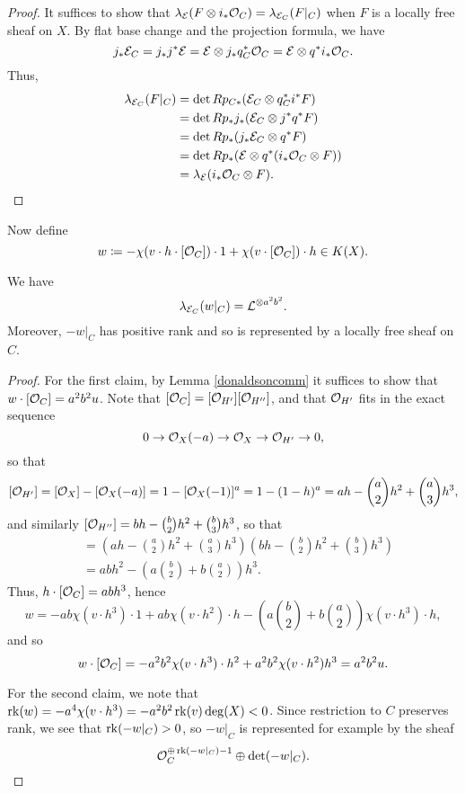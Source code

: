\begin{proof}
    It suffices to show that $\lambda_{\mathcal{E}}(F \otimes i_*\mathcal{O}_C) = \lambda_{\mathcal{E}_C}(F|_C)$ when $F$ is a locally free sheaf on $X$. By flat base change and the projection formula, we have
    \[ j_*\mathcal{E}_C = j_* j^* \mathcal{E} = \mathcal{E} \otimes j_* q_C^*\mathcal{O}_C = \mathcal{E} \otimes q^* i_* \mathcal{O}_C. \]
    Thus,
    \begin{align*}
        \lambda_{\mathcal{E}_C}(F|_C) & = \det R p_{C*}(\mathcal{E}_C \otimes q_C^* i^* F) \\
        & = \det R p_* j_*(\mathcal{E}_C \otimes j^* q^* F) \\
        & = \det R p_* (j_*\mathcal{E}_C \otimes q^* F) \\
        & = \det R p_* (\mathcal{E} \otimes q^* (i_* \mathcal{O}_C \otimes F)) \\
        & = \lambda_{\mathcal{E}}(i_*\mathcal{O}_C \otimes F).
    \end{align*}
\end{proof}
Now define
\[ w \coloneqq -\chi(v \cdot h \cdot [\mathcal{O}_C]) \cdot 1 + \chi(v \cdot [\mathcal{O}_C]) \cdot h \in K(X). \]
\begin{prop}\label{linebundleidentification}
We have
\[ \lambda_{\mathcal{E}_C}(w|_C) = \mathcal{L}^{\otimes a^2 b^2}. \]
Moreover, $-w|_C$ has positive rank and so is represented by a locally free sheaf on $C$.
\end{prop}
\begin{proof}
For the first claim, by Lemma \ref{donaldsoncomm} it suffices to show that $w\cdot [\mathcal{O}_C] = a^2 b^2 u$. Note that $[\mathcal{O}_C] = [\mathcal{O}_{H'}][\mathcal{O}_{H''}]$, and that $\mathcal{O}_{H'}$ fits in the exact sequence
\[ 0 \to \mathcal{O}_X(-a) \to \mathcal{O}_X \to \mathcal{O}_{H'} \to 0, \]
so that 
\[ [\mathcal{O}_{H'}] = [\mathcal{O}_X] - [\mathcal{O}_X(-a)] = 1 - [\mathcal{O}_X(-1)]^a = 1 - (1-h)^a = a h - \binom{a}{2} h^2 + \binom{a}{3} h^3, \]
and similarly $[\mathcal{O}_{H''}] = b h - \binom{b}{2} h^2 + \binom{b}{3} h^3$, so that
\begin{align*}
    [\Oh_C] & = (a h - \binom{a}{2} h^2 + \binom{a}{3} h^3)(b h - \binom{b}{2} h^2 + \binom{b}{3} h^3) \\
    & = a b h^2 - \left(a \binom{b}{2} + b \binom{a}{2} \right)h^3.
\end{align*} 
Thus, $h\cdot[\mathcal{O}_C] = a b h^3$, hence
\[ w = -a b \chi(v\cdot h^3) \cdot 1 + a b \chi(v \cdot h^2) \cdot h - \left(a \binom{b}{2} + b \binom{a}{2} \right)\chi(v\cdot h^3) \cdot h, \]
and so
\[ w \cdot [\mathcal{O}_C] = -a^2 b^2 \chi(v \cdot h^3) \cdot h^2 + a^2 b^2 \chi(v \cdot h^2) h^3 = a^2 b^2 u. \]

For the second claim, we note that $\operatorname{\mathrm{rk}}(w) = -a^4 \chi(v \cdot h^3) = - a^2 b^2 \operatorname{\mathrm{rk}}(v) \deg(X) < 0$. Since restriction to $C$ preserves rank, we see that $\operatorname{\mathrm{rk}}(-w|_C) > 0$, so $-w|_C$ is represented for example by the sheaf
\[ \mathcal{O}_C^{\oplus \operatorname{\mathrm{rk}}(-w|_C) - 1} \oplus \det(-w|_C). \]


\end{proof}


